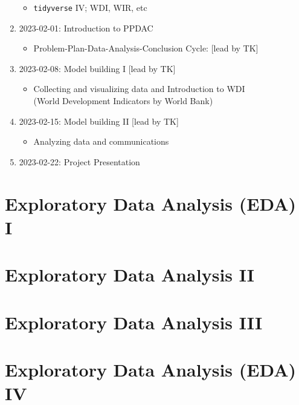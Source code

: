 \documentclass[
]{article}
\providecommand{\tightlist}{%
  \setlength{\itemsep}{0pt}\setlength{\parskip}{0pt}}
\begin{document}
\begin{enumerate}
  \begin{itemize}
  \tightlist
  \item
    \texttt{tidyverse} IV; WDI, WIR, etc
  \end{itemize}
\item
  2023-02-01: Introduction to PPDAC

  \begin{itemize}
  \tightlist
  \item
    Problem-Plan-Data-Analysis-Conclusion Cycle: {[}lead by TK{]}
  \end{itemize}
\item
  2023-02-08: Model building I {[}lead by TK{]}

  \begin{itemize}
  \tightlist
  \item
    Collecting and visualizing data and Introduction to WDI\\
    (World Development Indicators by World Bank)
  \end{itemize}
\item
  2023-02-15: Model building II {[}lead by TK{]}

  \begin{itemize}
  \tightlist
  \item
    Analyzing data and communications
  \end{itemize}
\item
  2023-02-22: Project Presentation
\end{enumerate}

\hypertarget{exploratory-data-analysis-eda-i}{%
\section{Exploratory Data Analysis (EDA)
I}\label{exploratory-data-analysis-eda-i}}

\hypertarget{exploratory-data-analysis-ii}{%
\section{Exploratory Data Analysis
II}\label{exploratory-data-analysis-ii}}

\hypertarget{exploratory-data-analysis-iii}{%
\section{Exploratory Data Analysis
III}\label{exploratory-data-analysis-iii}}

\hypertarget{exploratory-data-analysis-eda-iv}{%
\section{Exploratory Data Analysis (EDA)
IV}\label{exploratory-data-analysis-eda-iv}}
\end{document}
